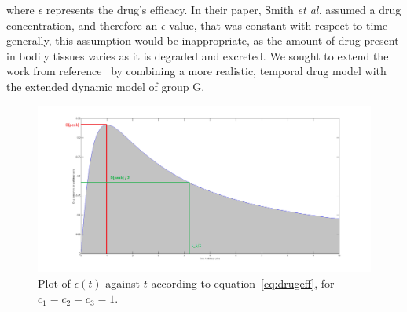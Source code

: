\documentclass[a4paper, 12pt]{report}
\begin{document}
where $\epsilon$ represents the drug's efficacy. In their paper, Smith \textit{et al.} assumed a drug concentration, and therefore an $\epsilon$ value, that was constant with respect to time -- generally, this assumption would be inappropriate, as the amount of drug present in bodily tissues varies as it is degraded and excreted. We sought to extend the work from reference~\cite{Smith} by combining a more realistic, temporal drug model with the extended dynamic model of group G.\cite{GroupG}

\begin{figure}[htb]
\begin{centering}
\includegraphics[width=150mm]{DrugProfile.png}
\caption{Plot of $\epsilon(t)$ against $t$ according to equation~\eqref{eq:drugeff}, for $c_1 = c_2 = c_3 = 1$.}
\label{fig:DrugProfile}
\end{centering}
\end{figure}
\end{document}
